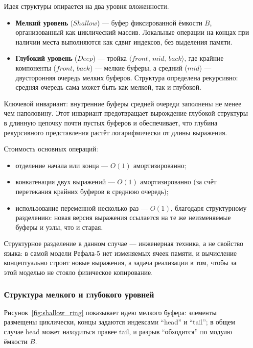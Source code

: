 \documentclass[14pt, russian]{scrartcl}
\newcommand{\enq}[1]{\enquote{#1}}
\begin{document}
Идея структуры опирается на два уровня вложенности.

\begin{itemize}
  \item \textbf{Мелкий уровень} (\(Shallow\)) --- буфер фиксированной
        ёмкости \(B\), организованный как циклический массив. Локальные
        операции на концах при наличии места выполняются как сдвиг
        индексов, без выделения памяти.
  \item \textbf{Глубокий уровень} (\(Deep\)) --- тройка \(\langle
        front,\, mid,\, back\rangle\), где крайние компоненты
        (\(front\), \(back\)) --- мелкие буферы, а средний (\(mid\)) ---
        двусторонняя
        очередь мелких буферов. Структура определена рекурсивно: средняя
        очередь сама может быть как мелкой, так и глубокой.
\end{itemize}

Ключевой инвариант: внутренние буферы средней очереди заполнены не менее
чем наполовину. Этот инвариант предотвращает вырождение глубокой
структуры в длинную цепочку почти пустых буферов и обеспечивает, что
глубина рекурсивного представления растёт логарифмически от длины
выражения.

Стоимость основных операций:

\begin{itemize}
  \item отделение начала или конца --- \(O(1)\) амортизированно;
  \item конкатенация двух выражений --- \(O(1)\) амортизированно (за счёт
        перетекания крайних буферов в среднюю очередь);
  \item использование переменной несколько раз --- \(O(1)\), благодаря
        структурному разделению: новая версия выражения
        ссылается на те же неизменяемые буферы и узлы, что и старая.
\end{itemize}

Структурное разделение в данном случае --- инженерная техника, а не
свойство языка: в самой модели Рефала-5 нет изменяемых ячеек памяти, и
вычисление концептуально строит новые выражения, а задача реализации в
том, чтобы за этой моделью не стояло физическое копирование.

\subsubsection{Структура мелкого и глубокого уровней}

Рисунок~\ref{fig:shallow_ring} показывает идею мелкого буфера: элементы
размещены циклически, концы задаются индексами \enq{head} и
\enq{tail}; в общем случае head может находиться правее tail, и
разрыв \enq{обходится} по модулю ёмкости \(B\).
\end{document}
